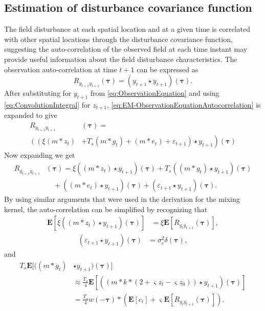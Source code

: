 \documentclass[10pt,twocolumn,twoside]{IEEEtran}
\begin{document}
\subsection{Estimation of disturbance covariance function}
The field disturbance at each spatial location and at a given time is correlated with other spatial locations through the disturbance covariance
function, suggesting the auto-correlation of the observed field at each time instant may provide useful information about the field disturbance characteristics.
The observation auto-correlation at time $t+1$ can be expressed as
\begin{equation}\label{eq:EM-ObservationEquationAutocorrelation}
	R_{y_{t+1}y_{t+1}}(\boldsymbol{\tau})=(y_{t+1} \star y_{t+1})(\boldsymbol\tau).
\end{equation}
 After substituting for $y_{t+1}$ from \eqref{eq:ObservationEquation} and using \eqref{eq:ConvolutionIntegral}   for $z_{t+1}$,  \eqref{eq:EM-ObservationEquationAutocorrelation} is expanded to give 
\begin{align}\label{eq:EM-expanded_auto_corr}  
	R_{y_{t+1}y_{t+1}} & (\boldsymbol{\tau}) = \\ \nonumber 
	\left( \left(\xi( m\ast z_{t}) \right.\right.&+\left.\left. T_s(m\ast g_{t}) + ( m \ast e_{t})+\varepsilon_{t+1} \right) \star y_{t+1} \right) (\boldsymbol{\tau})
\end{align}
Now expanding we get
\begin{align}\label{eq:expanded_auto_corr}
	R_{y_{t+1}y_{t+1}}&(\boldsymbol{\tau}) = \xi((m \ast z_{t}) \star y_{t+1})(\boldsymbol{\tau})+T_s((m\ast g_{t})\star y_{t+1})(\boldsymbol{\tau}) \nonumber \\
	&\quad+((m\ast e_{t})\star  y_{t+1})(\boldsymbol{\tau})+(\varepsilon_{t+1} \star y_{t+1})(\boldsymbol{\tau}).
\end{align}
By using similar arguments that were used in the derivation for the mixing kernel, the auto-correlation can be simplified by recognizing that
\begin{align}\label{eq:EM-Autoterm1} 
  \mathbf{E}[\xi((m\ast z_{t})\star y_{t+1})(\boldsymbol{\tau})]&=\xi \mathbf{E}[ R_{y_ty_{t+1}}(\boldsymbol{\tau})],
\end{align}
\begin{align}\label{eq:EM-Autoterm2}
 (\varepsilon_{t+1}\star y_{t+1})(\boldsymbol\tau)&=\sigma_{\varepsilon}^2\delta(\boldsymbol{\tau}),
\end{align} 
and
\begin{align}\label{eq:EM-Autoterm3} 
	T_s\mathbf{E}[((m\ast g_t) &\star y_{t+1})(\boldsymbol\tau)] \nonumber \\ 
	&\approx \frac{T_s}{4}\mathbf{E}[((m \ast k \ast (2 + \varsigma z_t - \varsigma z_0))\star y_{t+1})(\boldsymbol\tau)] \nonumber \\
	&= \frac{T_s}{4} w(-\boldsymbol\tau) \ast (\mathbf{E}\left[c_t\right] + \varsigma \mathbf{E}\left[R_{y_ty_{t+1}}(\boldsymbol\tau)\right] ).
\end{align}
\end{document}
